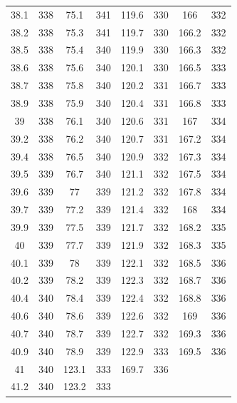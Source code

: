 \documentclass[12pt]{ctexart}
\numberwithin{equation}{section}
\begin{document}
\begin{longtable}{cc|cc|cc|cc}
38.1  &  338  &  75.1  &  341  &  119.6  &  330  &  166  &  332  \\
38.2  &  338  &  75.3  &  341  &  119.7  &  330  &  166.2  &  332  \\
38.5  &  338  &  75.4  &  340  &  119.9  &  330  &  166.3  &  332  \\
38.6  &  338  &  75.6  &  340  &  120.1  &  330  &  166.5  &  333  \\
38.7  &  338  &  75.8  &  340  &  120.2  &  331  &  166.7  &  333  \\
38.9  &  338  &  75.9  &  340  &  120.4  &  331  &  166.8  &  333  \\
39  &  338  &  76.1  &  340  &  120.6  &  331  &  167  &  334  \\
39.2  &  338  &  76.2  &  340  &  120.7  &  331  &  167.2  &  334  \\
39.4  &  338  &  76.5  &  340  &  120.9  &  332  &  167.3  &  334  \\
39.5  &  339  &  76.7  &  340  &  121.1  &  332  &  167.5  &  334  \\
39.6  &  339  &  77  &  339  &  121.2  &  332  &  167.8  &  334  \\
39.7  &  339  &  77.2  &  339  &  121.4  &  332  &  168  &  334  \\
39.9  &  339  &  77.5  &  339  &  121.7  &  332  &  168.2  &  335  \\
40  &  339  &  77.7  &  339  &  121.9  &  332  &  168.3  &  335  \\
40.1  &  339  &  78  &  339  &  122.1  &  332  &  168.5  &  336  \\
40.2  &  339  &  78.2  &  339  &  122.3  &  332  &  168.7  &  336  \\
40.4  &  340  &  78.4  &  339  &  122.4  &  332  &  168.8  &  336  \\
40.6  &  340  &  78.6  &  339  &  122.6  &  332  &  169  &  336  \\
40.7  &  340  &  78.7  &  339  &  122.7  &  332  &  169.3  &  336  \\
40.9  &  340  &  78.9  &  339  &  122.9  &  333  &  169.5  &  336  \\
41  &  340  &  123.1  &  333  &  169.7  &  336  \\
41.2  &  340  &  123.2  &  333  \\

\end{longtable}
\end{document}

